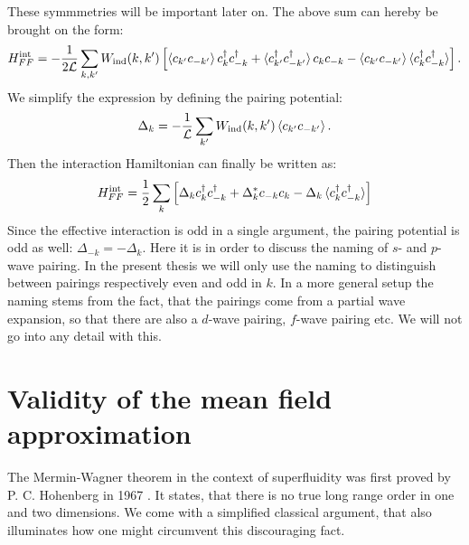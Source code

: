 These symmmetries will be important later on. The above sum can hereby be brought on the form:
\begin{equation}
H^\text{int}_{FF} = -\frac{1}{2\mathcal{L}}\sum_{k,k'} W_{\text{ind}}(k,k')\left[ \braket{ c_{k'}c_{-k'}} c^\dagger_k c^\dagger_{-k} + \braket {c^\dagger_{k'}c^\dagger_{-k'}} c_k c_{-k} - \braket {c_{k'}c_{-k'}} \braket {c^\dagger_{k}c^\dagger_{-k}} \right]. \nonumber
\end{equation}
We simplify the expression by defining the pairing potential:
\begin{equation}
\Delta_k = -\frac{1}{\mathcal{L}}\sum_{k'}W_{\text{ind}}(k,k')\braket {c_{k'}c_{-k'}}.
\label{eq.pairingpotentialdef}
\end{equation}
Then the interaction Hamiltonian can finally be written as:
\begin{equation}
H^\text{int}_{FF} = \frac{1}{2}\sum_{k} \left[ \Delta_k c^\dagger_k c^\dagger_{-k} + \Delta^*_k c_{-k} c_k  - \Delta_k \braket {c^\dagger_{k}c^\dagger_{-k}} \right]
\label{eq.HFFintfinal}
\end{equation}
Since the effective interaction is odd in a single argument, the pairing potential is odd as well: $\Delta_{-k} = -\Delta_k$. Here it is in order to discuss the naming of $s$- and $p$-wave pairing. In the present thesis we will only use the naming to distinguish between pairings respectively even and odd in $k$. In a more general setup the naming stems from the fact, that the pairings come from a partial wave expansion, so that there are also a $d$-wave pairing, $f$-wave pairing etc. We will not go into any detail with this.

\section{Validity of the mean field approximation} \label{sec.meanfieldvalidity}
The Mermin-Wagner theorem in the context of superfluidity was first proved by P. C. Hohenberg in 1967 \cite{Hohenberg.MerminWagnertheorem}. It states, that there is no true long range order in one and two dimensions. We come with a simplified classical argument, that also illuminates how one might circumvent this discouraging fact. 

